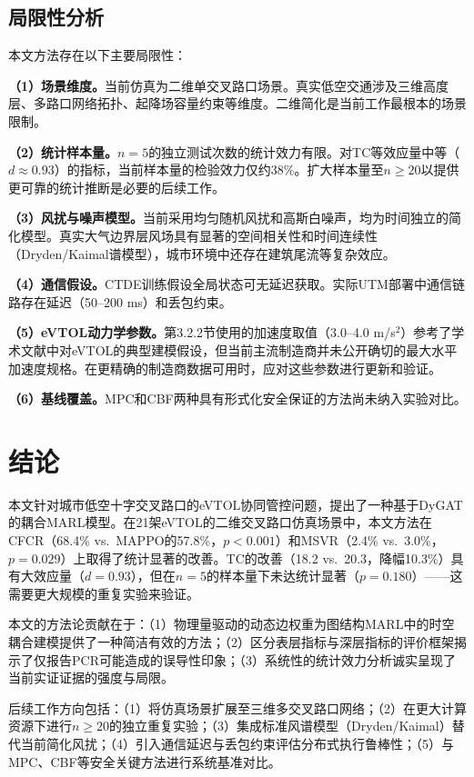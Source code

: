 \documentclass[12pt,a4paper,UTF8]{ctexart}
\begin{document}
\subsection{局限性分析}

本文方法存在以下主要局限性：

\textbf{（1）场景维度。}当前仿真为二维单交叉路口场景。真实低空交通涉及三维高度层、多路口网络拓扑、起降场容量约束等维度。二维简化是当前工作最根本的场景限制。

\textbf{（2）统计样本量。}$n=5$的独立测试次数的统计效力有限。对TC等效应量中等（$d\approx0.93$）的指标，当前样本量的检验效力仅约38\%。扩大样本量至$n\geq20$以提供更可靠的统计推断是必要的后续工作。

\textbf{（3）风扰与噪声模型。}当前采用均匀随机风扰和高斯白噪声，均为时间独立的简化模型。真实大气边界层风场具有显著的空间相关性和时间连续性（Dryden/Kaimal谱模型），城市环境中还存在建筑尾流等复杂效应。

\textbf{（4）通信假设。}CTDE训练假设全局状态可无延迟获取。实际UTM部署中通信链路存在延迟（50--200 ms）和丢包约束。

\textbf{（5）eVTOL动力学参数。}第3.2.2节使用的加速度取值（3.0--4.0 m/s$^2$）参考了学术文献中对eVTOL的典型建模假设，但当前主流制造商并未公开确切的最大水平加速度规格。在更精确的制造商数据可用时，应对这些参数进行更新和验证。

\textbf{（6）基线覆盖。}MPC和CBF两种具有形式化安全保证的方法尚未纳入实验对比。

\section{结论}

本文针对城市低空十字交叉路口的eVTOL协同管控问题，提出了一种基于DyGAT的耦合MARL模型。在21架eVTOL的二维交叉路口仿真场景中，本文方法在CFCR（68.4\% vs.\ MAPPO的57.8\%，$p<0.001$）和MSVR（2.4\% vs.\ 3.0\%，$p=0.029$）上取得了统计显著的改善。TC的改善（18.2 vs.\ 20.3，降幅10.3\%）具有大效应量（$d=0.93$），但在$n=5$的样本量下未达统计显著（$p=0.180$）——这需要更大规模的重复实验来验证。

本文的方法论贡献在于：（1）物理量驱动的动态边权重为图结构MARL中的时空耦合建模提供了一种简洁有效的方法；（2）区分表层指标与深层指标的评价框架揭示了仅报告PCR可能造成的误导性印象；（3）系统性的统计效力分析诚实呈现了当前实证证据的强度与局限。

后续工作方向包括：（1）将仿真场景扩展至三维多交叉路口网络；（2）在更大计算资源下进行$n\geq20$的独立重复实验；（3）集成标准风谱模型（Dryden/Kaimal）替代当前简化风扰；（4）引入通信延迟与丢包约束评估分布式执行鲁棒性；（5）与MPC、CBF等安全关键方法进行系统基准对比。
\end{document}
